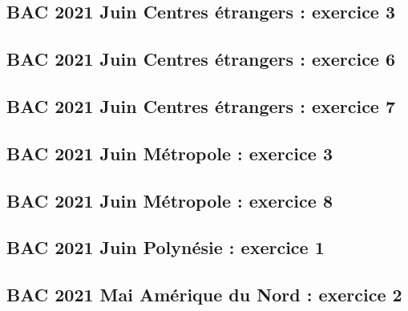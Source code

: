 \documentclass[lang=fr,edition=teacher,layout=sheet]{mxbook}
\begin{document}
\begingroup\endgroup
\par\bigskip
{}\subsection*{BAC 2021 Juin Centres étrangers : exercice 3}
\begingroup\endgroup
\par\bigskip
{}\subsection*{BAC 2021 Juin Centres étrangers : exercice 6}
\begingroup\endgroup
\par\bigskip
{}\subsection*{BAC 2021 Juin Centres étrangers : exercice 7}
\begingroup\endgroup
\par\bigskip
{}\subsection*{BAC 2021 Juin Métropole : exercice 3}
\begingroup\endgroup
\par\bigskip
{}\subsection*{BAC 2021 Juin Métropole : exercice 8}
\begingroup\endgroup
\par\bigskip
{}\subsection*{BAC 2021 Juin Polynésie : exercice 1}
\begingroup\endgroup
\par\bigskip
{}\subsection*{BAC 2021 Mai Amérique du Nord : exercice 2}
\end{document}
